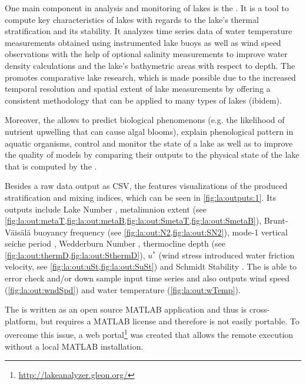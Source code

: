 One main component in analysis and monitoring of lakes is the \la \citep{read2011derivation}. It is a tool to compute key characteristics of lakes with regards to the lake's thermal stratification and its stability. It analyzes time series data of water temperature measurements obtained using instrumented lake buoys as well as wind speed observations with the help of optional salinity measurements to improve water density calculations and the lake's bathymetric areas with respect to depth. The \la promotes comparative lake research, which is made possible due to the increased temporal resolution and spatial extent of lake measurements by offering a consistent methodology that can be applied to many types of lakes (ibidem).

Moreover, the \la allows to predict biological phenomenons (e.g. the likelihood of nutrient upwelling that can cause algal blooms), explain phenological pattern in aquatic organisms, control and monitor the state of a lake as well as to improve the quality of models by comparing their outputs to the physical state of the lake that is computed by the \la.



Besides a raw data output as \ac{CSV}, the \la features visualizations of the produced stratification and mixing indices, which can be seen in \cref{fig:la:outputs:1}. Its outputs include Lake Number \citep[see \cref{fig:la:out:Ln,fig:la:out:SLn},][]{imberger1990}, metalimnion extent (see \cref{fig:la:out:metaT,fig:la:out:metaB,fig:la:out:SmetaT,fig:la:out:SmetaB}), Brunt-Väisälä buoyancy frequency (see \cref{fig:la:out:N2,fig:la:out:SN2}), mode-1 vertical seiche period \citep[see \cref{fig:la:out:T1,fig:la:out:ST1},][]{monismith1986}, Wedderburn Number \citep[see \cref{fig:la:out:W,fig:la:out:SW},][]{thompson1980}, thermocline depth (see \cref{fig:la:out:thermD,fig:la:out:SthermD}), $u^{*}$ (wind stress introduced water friction velocity, see \cref{fig:la:out:uSt,fig:la:out:SuSt}) and Schmidt Stability \citep[see \cref{fig:la:out:St},][]{schmidt1928,hutchinson1957,idso1973}. The \la is able to error check and/or down sample input time series and also outputs wind speed (\cref{fig:la:out:wndSpd}) and water temperature (\cref{fig:la:out:wTemp}).

The \la is written as an open source MATLAB application and thus is cross-platform, but requires a MATLAB license and therefore is not easily portable. To overcome this issue, a web portal\footnote{\url{http://lakeanalyzer.gleon.org/} \lastretrievedp} was created that allows the remote \la execution without a local MATLAB installation.

